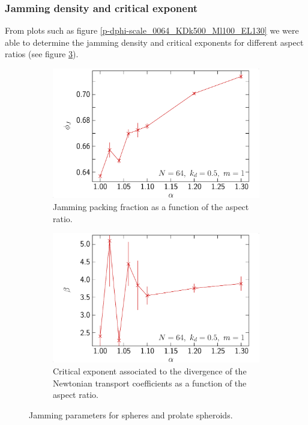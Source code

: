 \documentclass[class=report, float=false, crop=false]{standalone}
\begin{document}
\subsubsection{Jamming density and critical exponent}

From plots such as figure \ref{p-dphi-scale_0064_KDk500_Ml100_EL130} we were able to determine the jamming density and critical exponents for different aspect ratios (see figure \ref{phij_beta_0064}).

\begin{figure}[h!]
\centering
    \begin{subfigure}[t]{0.49\textwidth}
        \centering
        \includegraphics[width=\textwidth]{figures/figs/phij_alpha_0064_KDk500_Ml100}
        \caption{Jamming packing fraction as a function of the aspect ratio.}
        \label{phij_alpha_0064_KDk500_Ml100}
    \end{subfigure}
    \hfill
    \begin{subfigure}[t]{0.49\textwidth}
        \centering
        \includegraphics[width=\textwidth]{figures/figs/beta_alpha_0064_KDk500_Ml100}
        \caption{Critical exponent associated to the divergence of the Newtonian transport coefficients as a function of the aspect ratio.}
        \label{beta_alpha_0064_KDk500_Ml100}
    \end{subfigure}
    \caption{Jamming parameters for spheres and prolate spheroids.}
    \label{phij_beta_0064}
\end{figure}
\end{document}
